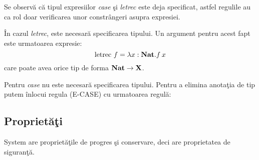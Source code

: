 Se observ\u a c\u a tipul expresiilor \emph{case} \c si \emph{letrec} este deja specificat, astfel regulile au ca rol doar verificarea unor constr\^ angeri asupra expresiei.

\begin{remark}
\^ In cazul \emph{letrec}, este necesar\u a specificarea tipului. Un argument pentru acest fapt este urmatoarea expresie:
$$ \text{letrec } f = \lambda x:{\textbf{Nat}} . f\app x $$
care poate avea orice tip de forma $\bf{Nat} \to X $.

Pentru \emph{case} nu este necesar\u a specificarea tipului. Pentru a elimina anota\c tia de tip putem \^ inlocui regula (E-CASE) cu urmatoarea regul\u a:

\begin{prooftree}
\end{prooftree}

\end{remark}

\done{}

\subsection{Propriet\u a\c ti}
\begin{theorem}[Siguran\c ta]
System \frec are propriet\u a\c tile de progres \c si conservare, deci are proprietatea de siguran\c t\u a.
\end{theorem}

